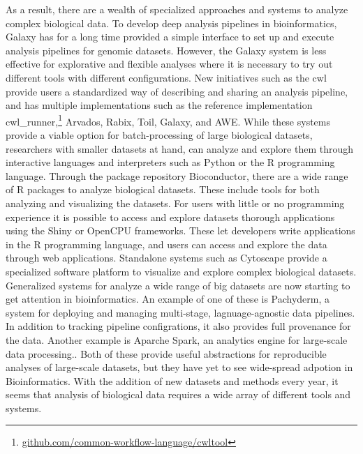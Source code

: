 As a result, there are a wealth of specialized approaches and systems 
to analyze complex biological data. To develop deep analysis pipelines in
bioinformatics, Galaxy\cite{galaxy} has for a long time provided a simple
interface to set up and execute analysis pipelines for genomic datasets.
However, the Galaxy system is less effective for explorative and flexible
analyses where it is necessary 
to try out different tools with different
configurations.\cite{spjuth2015experiences} New initiatives such as the
\gls{cwl} provide users a standardized way of describing and sharing an analysis
pipeline, and has multiple implementations such as the reference implementation
cwl\_runner,\footnote{\url{github.com/common-workflow-language/cwltool}}
Arvados,\cite{arvados} Rabix,\cite{rabix} Toil,\cite{toil} Galaxy,\cite{galaxy}
and AWE.\cite{awe}
While these systems provide a viable option for batch-processing of
large biological datasets, researchers with smaller datasets at hand, can
analyze and explore them through interactive languages and interpreters such as
Python or the  R programming language. Through the package repository
Bioconductor, there are a wide range of R packages to analyze biological
datasets. These include tools for both analyzing and visualizing the datasets.
For users with little or no programming experience it is possible to access and
explore datasets thorough applications using the Shiny or OpenCPU frameworks.
These let developers write applications in the R programming language, and users
can access and explore the data through web applications. Standalone systems
such as Cytoscape provide a specialized software platform to visualize and
explore complex biological datasets.\cite{cytoscape} 
Generalized systems for analyze a wide range of big datasets are now starting to
get attention in bioinformatics. An example of one of these is Pachyderm, a
system for deploying and managing multi-stage, lagnuage-agnostic data
pipelines.\cite{pachyderm} In addition to tracking pipeline configrations,
it also provides full provenance for the data.
Another example is Aparche Spark, an analytics engine for large-scale data
processing.\cite{spark}. Both of these provide useful abstractions for
reproducible analyses of large-scale datasets, but they have yet to see
wide-spread adpotion in Bioinformatics.  
With the addition of new datasets and methods every year, it seems that analysis
of biological data requires a wide array of different tools and systems.

